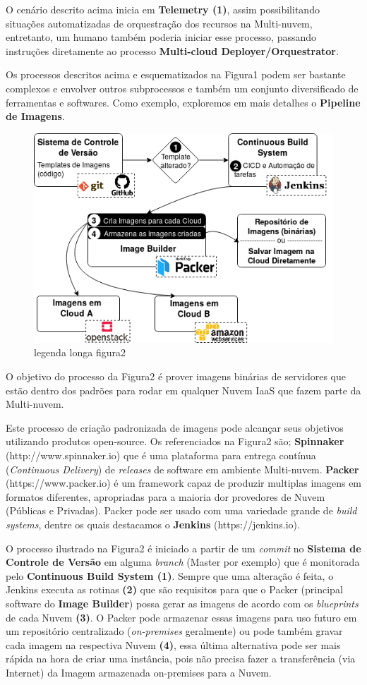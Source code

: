 \documentclass[12pt]{article}
\begin{document}
	O cenário descrito acima inicia em \textbf{Telemetry (1)}, assim possibilitando situações automatizadas de orquestração dos recursos na Multi-nuvem, entretanto, um humano também poderia iniciar esse processo, passando instruções diretamente ao processo \textbf{Multi-cloud Deployer/Orquestrator}.  
	
	Os processos descritos acima e esquematizados na Figura1 podem ser bastante complexos e envolver outros subprocessos e também um conjunto diversificado de ferramentas e softwares. Como exemplo, exploremos em mais detalhes o \textbf{Pipeline de Imagens}.
		
    \begin{figure}[H]
    	\centering
    	\includegraphics[width=0.7\linewidth]{figuras/Figure2.png}
    	\caption{legenda longa figura2}
    	\label{fig:figure2}
    \end{figure}
    
	O objetivo do processo da Figura2 é prover imagens binárias de servidores que estão dentro dos padrões para rodar em qualquer Nuvem IaaS que fazem parte da Multi-nuvem.
	
	Este processo de criação padronizada de imagens pode alcançar seus objetivos utilizando produtos open-source. Os referenciados na Figura2 são; \textbf{Spinnaker} (http://www.spinnaker.io) que é uma plataforma para entrega contínua (\textit{Continuous Delivery}) de \textit{releases} de software em ambiente Multi-nuvem. \textbf{Packer} (https://www.packer.io) é um framework capaz de produzir multiplas imagens em formatos diferentes, apropriadas para a maioria dor provedores de Nuvem (Públicas e Privadas). Packer pode ser usado com uma variedade grande de \textit{build systems}, dentre os quais destacamos o \textbf{Jenkins} (https://jenkins.io).

	O processo ilustrado na Figura2 é iniciado a partir de um \textit{commit} no \textbf{Sistema de Controle de Versão} em alguma \textit{branch} (Master por exemplo) que é monitorada pelo \textbf{Continuous Build System (1)}. Sempre que uma alteração é feita, o Jenkins executa as rotinas \textbf{(2)} que são requisitos para que o Packer (principal software do \textbf{Image Builder}) possa gerar as imagens de acordo com os \textit{blueprints} de cada Nuvem \textbf{(3)}. O Packer pode armazenar essas imagens para uso futuro em um repositório centralizado (\textit{on-premises} geralmente) ou pode também gravar cada imagem na respectiva Nuvem \textbf{(4)}, essa última alternativa pode ser mais rápida na hora de criar uma instância, pois não precisa fazer a transferência (via Internet) da Imagem armazenada on-premises para a Nuvem.
	
\end{document}
